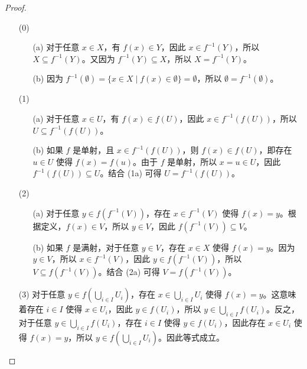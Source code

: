 \begin{proof}
	\begin{enumerate}
		\item[(0)]
		\begin{enumerate}
			\item[(a)] 对于任意 \( x \in X \)，有 \( f(x) \in Y \)，因此 \( x \in f^{-1}(Y) \)，所以 \( X \subseteq f^{-1}(Y) \)。又因为 \( f^{-1}(Y) \subseteq X \)，所以 \( X = f^{-1}(Y) \)。
			
			\item[(b)] 因为 \( f^{-1}(\emptyset) = \{ x \in X \mid f(x) \in \emptyset \} = \emptyset \)，所以 \( \emptyset = f^{-1}(\emptyset) \)。 \end{enumerate}
		
		\item[(1)]
		\begin{enumerate}
			\item[(a)] 对于任意 \( x \in U \)，有 \( f(x) \in f(U) \)，因此 \( x \in f^{-1}(f(U)) \)，所以 \( U \subseteq f^{-1}(f(U)) \)。
			
			\item[(b)] 如果 \( f \) 是单射，且 \( x \in f^{-1}(f(U)) \)，则 \( f(x) \in f(U) \)，即存在 \( u \in U \) 使得 \( f(x) = f(u) \)。由于 \( f \) 是单射，所以 \( x = u \in U \)，因此 \( f^{-1}(f(U)) \subseteq U \)。结合 (1a) 可得 \( U = f^{-1}(f(U)) \)。 \end{enumerate}
		
		\item[(2)]
		\begin{enumerate}
			\item[(a)] 对于任意 \( y \in f(f^{-1}(V)) \)，存在 \( x \in f^{-1}(V) \) 使得 \( f(x) = y \)。根据定义，\( f(x) \in V \)，所以 \( y \in V \)，因此 \( f(f^{-1}(V)) \subseteq V \)。
			
			\item[(b)] 如果 \( f \) 是满射，对于任意 \( y \in V \)，存在 \( x \in X \) 使得 \( f(x) = y \)。因为 \( y \in V \)，所以 \( x \in f^{-1}(V) \)，因此 \( y \in f(f^{-1}(V)) \)，所以 \( V \subseteq f(f^{-1}(V)) \)。结合 (2a) 可得 \( V = f(f^{-1}(V)) \)。 \end{enumerate}
		
		\item[(3)] 对于任意 \( y \in f\left(\bigcup_{i \in I} U_i\right) \)，存在 \( x \in \bigcup_{i \in I} U_i \) 使得 \( f(x) = y \)。这意味着存在 \( i \in I \) 使得 \( x \in U_i \)，因此 \( y \in f(U_i) \)，所以 \( y \in \bigcup_{i \in I} f(U_i) \)。反之，对于任意 \( y \in \bigcup_{i \in I} f(U_i) \)，存在 \( i \in I \) 使得 \( y \in f(U_i) \)，因此存在 \( x \in U_i \) 使得 \( f(x) = y \)，所以 \( y \in f\left(\bigcup_{i \in I} U_i\right) \)。因此等式成立。
		

\end{enumerate}
\end{proof}
